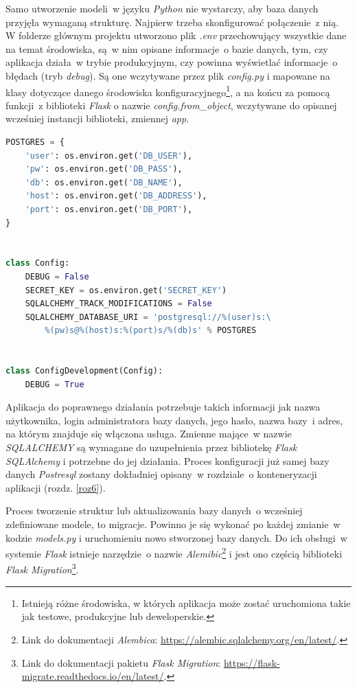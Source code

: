 Samo utworzenie modeli~w języku \textit{Python} nie wystarczy, aby baza danych przyjęła wymaganą strukturę. Najpierw trzeba skonfigurować połączenie~z nią. W folderze głównym projektu utworzono plik \textit{.env} przechowujący wszystkie dane na temat środowiska, są~w nim opisane informacje~o bazie danych, tym, czy aplikacja działa~w trybie produkcyjnym, czy powinna wyświetlać informacje~o błędach (tryb \textit{debug})\cite{flask}. Są one wczytywane przez plik \textit{config.py} i mapowane na klasy dotyczące danego środowiska konfiguracyjnego\footnote{Istnieją różne środowiska, w których aplikacja może zostać uruchomiona takie jak testowe, produkcyjne lub deweloperskie.}, a na końcu za pomocą funkcji~z biblioteki \textit{Flask} o nazwie \textit{config.from\_object}\cite{flask}, wczytywane do opisanej wcześniej instancji biblioteki, zmiennej \textit{app}.
\newpage
\begin{lstlisting}[language=Python, caption={Klasa odpowiedzialna za wczytywanie i zapisanie konfiguracji międzyinnymi bazy danych.}]
POSTGRES = {
    'user': os.environ.get('DB_USER'),
    'pw': os.environ.get('DB_PASS'),
    'db': os.environ.get('DB_NAME'),
    'host': os.environ.get('DB_ADDRESS'),
    'port': os.environ.get('DB_PORT'),
}


class Config:
    DEBUG = False
    SECRET_KEY = os.environ.get('SECRET_KEY')
    SQLALCHEMY_TRACK_MODIFICATIONS = False
    SQLALCHEMY_DATABASE_URI = 'postgresql://%(user)s:\
        %(pw)s@%(host)s:%(port)s/%(db)s' % POSTGRES


class ConfigDevelopment(Config):
    DEBUG = True
\end{lstlisting}

Aplikacja do poprawnego działania potrzebuje takich informacji jak nazwa użytkownika, login administratora bazy danych, jego hasło, nazwa bazy~i adres, na którym znajduje się włączona usługa. Zmienne mające~w nazwie \textit{SQLALCHEMY} są wymagane do uzupełnienia przez bibliotekę \textit{Flask SQLAlchemy} i potrzebne do jej działania. Proces konfiguracji już samej bazy danych \textit{Postresql} zostany dokładniej opisany~w rozdziale~o konteneryzacji aplikacji (rozdz. \ref{roz6}).


Proces tworzenie struktur lub aktualizowania bazy danych~o wcześniej zdefiniowane modele, to migracje. Powinno je się wykonać po każdej zmianie~w kodzie \textit{models.py} i uruchomieniu nowo stworzonej bazy danych\cite{django}. Do ich obsługi~w systemie \textit{Flask} istnieje narzędzie~o nazwie \textit{Alemibic}\footnote{Link do dokumentacji \textit{Alembica}: \url{https://alembic.sqlalchemy.org/en/latest/}.} i jest ono częścią biblioteki \textit{Flask Migration}\footnote{Link do dokumentacji pakietu \textit{Flask Migration}: \url{https://flask-migrate.readthedocs.io/en/latest/}.}.

